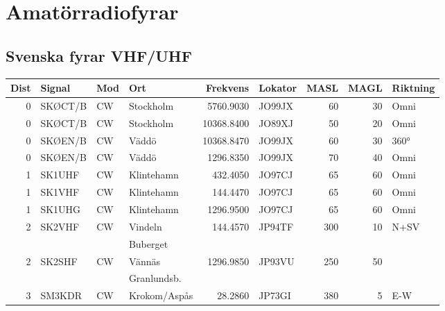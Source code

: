 \clearpage

\section{Amatörradiofyrar}

\subsection{Svenska fyrar VHF/UHF}

\scriptsize

\begin{longtable}{rlllrlrrl}
	\bf Dist & \bf Signal & \bf Mod  & \bf Ort      & \bf Frekvens & \bf Lokator & \bf MASL & \bf MAGL & \bf Riktning \\ \hline
	       0 & SKØCT/B    & CW       & Stockholm    &    5760.9030 & JO99JX      &       60 &       30 & Omni         \\
	       0 & SKØCT/B    & CW       & Stockholm    &   10368.8400 & JO89XJ      &       50 &       20 & Omni         \\
	       0 & SKØEN/B    & CW       & Väddö        &   10368.8470 & JO99JX      &       60 &       30 & 360°         \\
	       0 & SKØEN/B    & CW       & Väddö        &    1296.8350 & JO99JX      &       70 &       40 & Omni         \\
	       1 & SK1UHF     & CW       & Klintehamn   &     432.4050 & JO97CJ      &       65 &       60 & Omni         \\
	       1 & SK1VHF     & CW       & Klintehamn   &     144.4470 & JO97CJ      &       65 &       60 & Omni         \\
	       1 & SK1UHG     & CW       & Klintehamn   &    1296.9500 & JO97CJ      &       65 &       60 & Omni         \\
	       2 & SK2VHF     & CW       & Vindeln      &     144.4570 & JP94TF      &      300 &       10 & N+SV         \\
	         &            &          & Buberget     &              &             &          &          &              \\
	       2 & SK2SHF     & CW       & Vännäs       &    1296.9850 & JP93VU      &      250 &       50 &              \\
	         &            &          & Granlundsb.  &              &             &          &          &              \\
	       3 & SM3KDR     & CW       & Krokom/Aspås &      28.2860 & JP73GI      &      380 &        5 & E-W          \\

\end{longtable}
